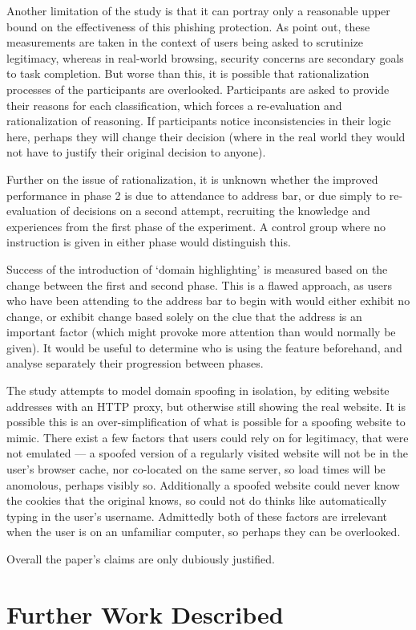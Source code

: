 \documentclass[a4paper,12pt]{article}
\begin{document}
Another limitation of the study is that it can portray only a reasonable upper bound on the effectiveness of this phishing protection. As \citeauthor{Lin:2011:DHH:1978942.1979244} point out, these measurements are taken in the context of users being asked to scrutinize legitimacy, whereas in real-world browsing, security concerns are secondary goals to task completion\cite{whitten1999johnny,kumaraguru2010teaching}. But worse than this, it is possible that rationalization processes of the participants are overlooked. Participants are asked to provide their reasons for each classification, which forces a re-evaluation and rationalization of reasoning. If participants notice inconsistencies in their logic here, perhaps they will change their decision (where in the real world they would not have to justify their original decision to anyone).

Further on the issue of rationalization, it is unknown whether the improved performance in phase 2 is due to attendance to address bar, or due simply to re-evaluation of decisions on a second attempt, recruiting the knowledge and experiences from the first phase of the experiment. A control group where no instruction is given in either phase would distinguish this.

Success of the introduction of `domain highlighting' is measured based on the change between the first and second phase. This is a flawed approach, as users who have been attending to the address bar to begin with would either exhibit no change, or exhibit change based solely on the clue that the address is an important factor (which might provoke more attention than would normally be given). It would be useful to determine who is using the feature beforehand, and analyse separately their progression between phases.

The study attempts to model domain spoofing in isolation, by editing website addresses with an HTTP proxy, but otherwise still showing the real website. It is possible this is an over-simplification of what is possible for a spoofing website to mimic. There exist a few factors that users could rely on for legitimacy, that were not emulated --- a spoofed version of a regularly visited website will not be in the user's browser cache, nor co-located on the same server, so load times will be anomolous, perhaps visibly so. Additionally a spoofed website could never know the cookies that the original knows, so could not do thinks like automatically typing in the user's username. Admittedly both of these factors are irrelevant when the user is on an unfamiliar computer, so perhaps they can be overlooked. 

Overall the paper's claims are only dubiously justified.

\section{Further Work Described}

%
%
\printbibliography
\end{document}
